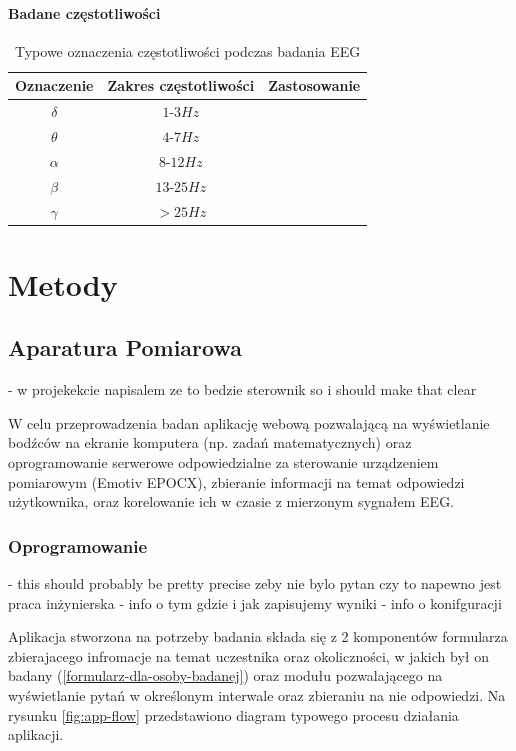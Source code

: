 \documentclass{./assets/wfis}
\begin{document}
\subsubsection{Badane częstotliwości}

\begin{table}[h]
    \centering
    \begin{tabular}{|c|c|c|}
        \hline
        Oznaczenie & Zakres częstotliwości & Zastosowanie \\
        \hline
        $\delta$ & $1$-$3Hz$ & \\
        $\theta$ & $4$-$7Hz$ & \\
        $\alpha$ & $8$-$12Hz$ & \\
        $\beta$  & $13$-$25Hz$ & \\
        $\gamma$ & $>25Hz$ & \\
        \hline
    \end{tabular}
    \caption{Typowe oznaczenia częstotliwości podczas badania EEG}
    \label{tab:freqs}
\end{table}
\chapter{Metody}

\section{Aparatura Pomiarowa}\label{aparatura-pomiarowa}

- w projekekcie napisalem ze to bedzie sterownik so i should make that clear

W celu przeprowadzenia badan aplikację webową pozwalającą na wyświetlanie bodźców na ekranie komputera (np. zadań matematycznych) oraz oprogramowanie serwerowe odpowiedzialne za sterowanie urządzeniem pomiarowym (Emotiv EPOCX), zbieranie informacji na temat odpowiedzi użytkownika, oraz korelowanie ich w czasie z mierzonym sygnałem EEG.

\subsection{Oprogramowanie}
- this should probably be pretty precise zeby nie bylo pytan czy to napewno jest praca inżynierska
- info o tym gdzie i jak zapisujemy wyniki
- info o konifguracji
 
Aplikacja stworzona na potrzeby badania składa się z 2 komponentów formularza zbierajacego infromacje na temat uczestnika oraz okoliczności, w jakich był on badany (\autoref{formularz-dla-osoby-badanej}) oraz modułu pozwalającego na wyświetlanie pytań w określonym interwale oraz zbieraniu na nie odpowiedzi. Na rysunku \ref{fig:app-flow} przedstawiono diagram typowego procesu działania aplikacji.
\end{document}
